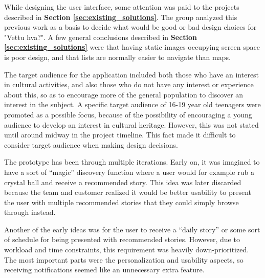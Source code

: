 While designing the user interface, some attention was paid to the projects described in \textbf{Section \ref{sec:existing_solutions}}. The group analyzed this previous work as a basis to decide what would be good or bad design choices for "Vettu hva?". A few general conclusions described in \textbf{Section \ref{sec:existing_solutions}} were that having static images occupying screen space is poor design, and that lists are normally easier to navigate than maps.\newline


The target audience for the application included both those who have an interest in cultural activities, and also those who do not have any interest or experience about this, so as to encourage more of the general population to discover an interest in the subject. A specific target audience of 16-19 year old teenagers were promoted as a possible focus, because of the possibility of encouraging a young audience to develop an interest in cultural heritage. However, this was not stated until around  midway in the project timeline. This fact made it difficult to consider target audience when making design decisions. \newline

The prototype has been through multiple iterations. Early on, it was imagined to have a sort of “magic” discovery function where a user would for example rub a crystal ball and receive a recommended story. This idea was later discarded because the team and customer realized
 it would be better usability to present the user with multiple recommended stories that they could simply browse through instead.\newline

Another of the early ideas was for the user to receive a “daily story” or some sort of schedule for being presented with recommended stories. However, due to workload and time constraints, this requirement was heavily down-prioritized. The most important parts were the personalization and usability aspects, so receiving notifications seemed like an unnecessary extra feature.\newline

